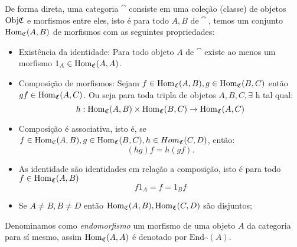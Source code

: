\documentclass[../main]{subfiles}
\begin{document}
\begin{definition}[Categorias]
De forma direta, uma categoria \(\cat\) consiste em uma coleção (classe) de
objetos \(\text{Obj} \mathfrak{C}\) e morfismos entre eles, isto é para todo \(A, B \text{ de
} \cat\), temos um conjunto \(\text{Hom}_{\mathfrak{C}}(A, B)\) de morfismos com as seguintes
propriedades:

\begin{itemize}
    \item Existência da identidade: Para todo objeto \(A\) de \(\cat\) existe ao
    menos um morfismo \(1_A \in \text{Hom}_{\mathfrak{C}}(A, A)\).
    \item Composição de morfismos: Sejam \(f \in \text{Hom}_{\mathfrak{C}} (A, B), g \in
    \text{Hom}_{\mathfrak{C}}(B, C)\) então \(gf \in \text{Hom}_{\mathfrak{C}}(A, C)\). Ou seja para toda tripla
    de objetos \(A, B, C, \exists\) h tal qual:
    \[h: \text{Hom}_{\mathfrak{C}} (A, B) \times \text{Hom}_{\mathfrak{C}} (B, C) \to \text{Hom}_{\mathfrak{C}} (A, C)\]
    \item Composição é associativa, isto é, se \(f \in \text{Hom}_{\mathfrak{C}}(A, B), g \in
    \text{Hom}_{\mathfrak{C}}(B, C), h \in Hom_{\mathfrak{C}} (C, D)\), então:
    \[(hg)f = h(gf).\]
    \item As identidade são identidades em relação a composição, isto é para
    todo \(f \in \text{Hom}_{\mathfrak{C}} (A, B)\)
    \[f1_A = f = 1_B f\]
    \item Se \(A \neq B, B \neq D\) então \(\text{Hom}_{\mathfrak{C}}(A, B), \text{Hom}_{\mathfrak{C}}(C, D)\)
    são disjuntos;
\end{itemize}
\end{definition}

Denominamos como \textit{endomorfismo} um morfismo de uma objeto \(A\) da
categoria para sí mesmo, assim \(\text{Hom}_{\mathfrak{C}} (A, A)\) é denotado por
\(\text{End}_\cat(A)\). 
\end{document}
